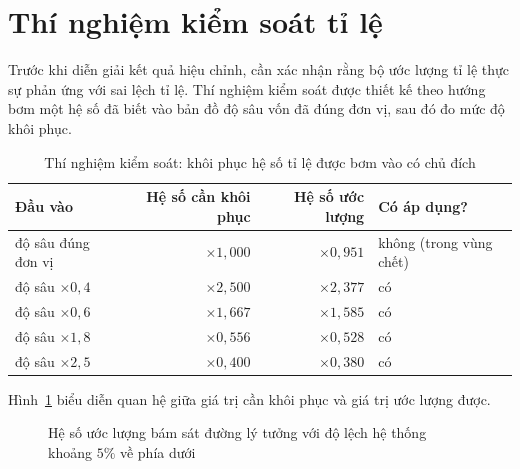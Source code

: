 \section{Thí nghiệm kiểm soát tỉ lệ}

Trước khi diễn giải kết quả hiệu chỉnh, cần xác nhận rằng bộ ước lượng tỉ lệ thực sự phản ứng với sai lệch tỉ lệ. Thí nghiệm kiểm soát được thiết kế theo hướng bơm một hệ số đã biết vào bản đồ độ sâu vốn đã đúng đơn vị, sau đó đo mức độ khôi phục.

\begin{table}[H]
\centering
\caption{Thí nghiệm kiểm soát: khôi phục hệ số tỉ lệ được bơm vào có chủ đích}
\label{tab:kiem_soat}
\small
\begin{tabular}{lrrl}
\toprule
\textbf{Đầu vào} & \textbf{Hệ số cần khôi phục} & \textbf{Hệ số ước lượng} & \textbf{Có áp dụng?} \\
\midrule
độ sâu đúng đơn vị    & $\times 1{,}000$ & $\times 0{,}951$ & không (trong vùng chết) \\
độ sâu $\times 0{,}4$ & $\times 2{,}500$ & $\times 2{,}377$ & có \\
độ sâu $\times 0{,}6$ & $\times 1{,}667$ & $\times 1{,}585$ & có \\
độ sâu $\times 1{,}8$ & $\times 0{,}556$ & $\times 0{,}528$ & có \\
độ sâu $\times 2{,}5$ & $\times 0{,}400$ & $\times 0{,}380$ & có \\
\bottomrule
\end{tabular}
\end{table}

Hình~\ref{fig:control_chart} biểu diễn quan hệ giữa giá trị cần khôi phục và giá trị ước lượng
được.

\begin{figure}[H]
\centering
{}
\caption{Hệ số ước lượng bám sát đường lý tưởng với độ lệch hệ thống khoảng $5\%$ về phía dưới}
\label{fig:control_chart}
\end{figure}

